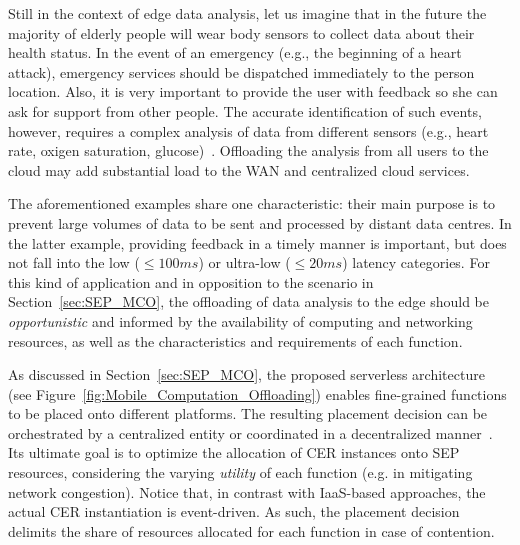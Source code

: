 Still in the context of edge data analysis, 
let us imagine that in the future the majority of elderly people will wear body sensors to collect data about their health status. In the event of an emergency (e.g., the beginning of a heart attack), emergency services should be dispatched immediately to the person location. Also, it is very important to provide the user with feedback so she can ask for support from other people.
The accurate identification of such events, however, requires a complex analysis of data from different sensors (e.g., heart rate, oxigen saturation, glucose)~\cite{Li:2017}. Offloading the analysis from all users to the cloud may add substantial load to the WAN and centralized cloud services. %

The aforementioned examples share one characteristic: their main purpose is to prevent large volumes of data to be sent and processed by distant data centres. In the latter example, providing feedback in a timely manner is important, but does not fall into the low ($\leq 100ms$) or ultra-low ($\leq 20ms$) latency categories. For this kind of application and in opposition to the scenario in Section~\ref{sec:SEP_MCO}, the offloading of data analysis 
to the edge should be \textit{opportunistic} and informed by the availability of computing and networking resources, as well as the characteristics and requirements of each function.

As discussed in Section~\ref{sec:SEP_MCO}, the proposed serverless architecture (see Figure~\ref{fig:Mobile_Computation_Offloading}) enables fine-grained functions to be placed onto different platforms. %
The resulting placement decision can be orchestrated by a centralized entity or coordinated in a decentralized manner~\cite{Mach:2017}. Its ultimate goal is to optimize the allocation of CER instances onto SEP resources, considering the varying \textit{utility} of each function (e.g. in mitigating network congestion). Notice that, in contrast with IaaS-based approaches, the actual CER instantiation is event-driven. As such, the placement decision delimits the share of resources allocated for each function in case of contention.

